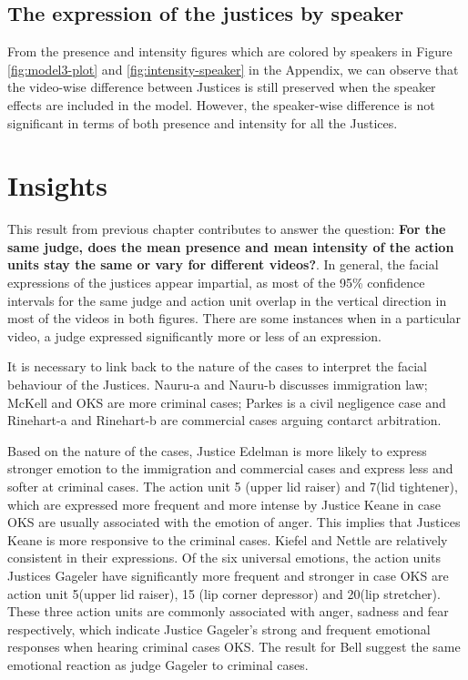 \documentclass{monashthesis}
\begin{document}
\hypertarget{the-expression-of-the-justices-by-speaker}{%
\subsection{The expression of the justices by speaker}\label{the-expression-of-the-justices-by-speaker}}

From the presence and intensity figures which are colored by speakers in Figure \ref{fig:model3-plot} and \ref{fig:intensity-speaker} in the Appendix, we can observe that the video-wise difference between Justices is still preserved when the speaker effects are included in the model. However, the speaker-wise difference is not significant in terms of both presence and intensity for all the Justices.

\let\cleardoublepage\clearpage

\hypertarget{insights}{%
\section{Insights}\label{insights}}

This result from previous chapter contributes to answer the question: \textbf{For the same judge, does the mean presence and mean intensity of the action units stay the same or vary for different videos?}. In general, the facial expressions of the justices appear impartial, as most of the 95\% confidence intervals for the same judge and action unit overlap in the vertical direction in most of the videos in both figures. There are some instances when in a particular video, a judge expressed significantly more or less of an expression.

It is necessary to link back to the nature of the cases to interpret the facial behaviour of the Justices. Nauru-a and Nauru-b discusses immigration law; McKell and OKS are more criminal cases; Parkes is a civil negligence case and Rinehart-a and Rinehart-b are commercial cases arguing contarct arbitration.

Based on the nature of the cases, Justice Edelman is more likely to express stronger emotion to the immigration and commercial cases and express less and softer at criminal cases. The action unit 5 (upper lid raiser) and 7(lid tightener), which are expressed more frequent and more intense by Justice Keane in case OKS are usually associated with the emotion of anger. This implies that Justices Keane is more responsive to the criminal cases. Kiefel and Nettle are relatively consistent in their expressions. Of the six universal emotions, the action units Justices Gageler have significantly more frequent and stronger in case OKS are action unit 5(upper lid raiser), 15 (lip corner depressor) and 20(lip stretcher). These three action units are commonly associated with anger, sadness and fear respectively, which indicate Justice Gageler's strong and frequent emotional responses when hearing criminal cases OKS. The result for Bell suggest the same emotional reaction as judge Gageler to criminal cases.
\end{document}
